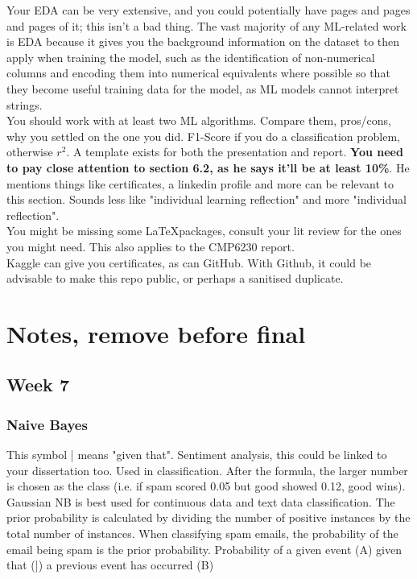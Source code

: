 \documentclass[12pt]{report}
\begin{document}
Your EDA can be very extensive, and you could potentially have pages and pages and pages of it; this isn't a bad thing.
The vast majority of any ML-related work is EDA because it gives you the background information on the dataset to then apply
when training the model, such as the identification of non-numerical columns and encoding them into numerical equivalents where
possible so that they become useful training data for the model, as ML models cannot interpret strings.
\\
\noindent
You should work with at least two ML algorithms. Compare them, pros/cons, why you settled on the one you did.
F1-Score if you do a classification problem, otherwise $r^2$. A template exists for both the presentation and report.
\noindent \textbf{You need to pay close attention to section 6.2, as he says it'll be at least 10\%}.
He mentions things like certificates, a linkedin profile and more can be relevant to this section.
Sounds less like "individual learning reflection" and more "individual reflection".
\\
\noindent 
You might be missing some \LaTeX packages, consult your lit review for the ones you might need.
This also applies to the CMP6230 report.
\\
\noindent
Kaggle can give you certificates, as can GitHub. With Github, it could be 
advisable to make this repo public, or perhaps a sanitised duplicate. 

\chapter{Notes, remove before final}
\section{Week 7}
\subsection{Naive Bayes}
This symbol | means "given that".
Sentiment analysis, this could be linked to your dissertation too.
Used in classification. After the formula, the larger number is chosen as the class (i.e. if spam scored 0.05 but good showed 0.12, good wins).
Gaussian NB is best used for continuous data and text data classification.
The prior probability is calculated by dividing the number of positive instances by the total number of instances.
When classifying spam emails, the probability of the email being spam is the prior probability.
Probability of a given event (A) given that (|) a previous event has occurred (B)
\end{document}
